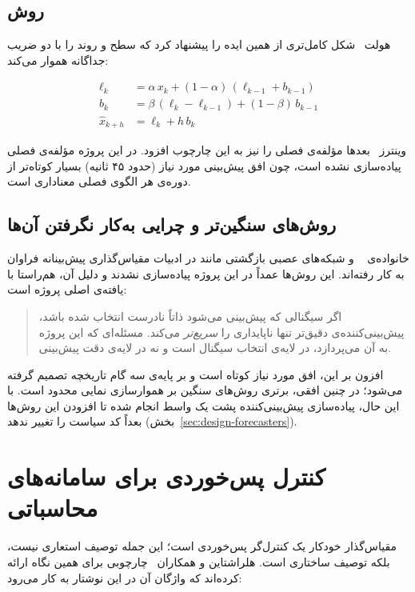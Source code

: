\subsection{روش }
\label{sec:bg-holt}

هولت~\cite{holt2004} شکل کامل‌تری از همین ایده را پیشنهاد کرد که سطح و روند را با دو ضریب
جداگانه هموار می‌کند:

\begin{align}
\label{eq:holt}
\ell_k &= \alpha\, x_k + (1-\alpha)\,(\ell_{k-1} + b_{k-1}) \\
b_k &= \beta\,(\ell_k - \ell_{k-1}) + (1-\beta)\, b_{k-1} \\
\hat{x}_{k+h} &= \ell_k + h\, b_k
\end{align}

وینترز~\cite{winters1960} بعدها مؤلفه‌ی فصلی را نیز به این چارچوب افزود. در این پروژه
مؤلفه‌ی فصلی پیاده‌سازی نشده است، چون افق پیش‌بینی مورد نیاز (حدود ۴۵ ثانیه) بسیار کوتاه‌تر
از دوره‌ی هر الگوی فصلی معناداری است.

\subsection{روش‌های سنگین‌تر و چرایی به‌کار نگرفتن آن‌ها}
\label{sec:bg-arima}

خانواده‌ی ~\cite{boxjenkins} و شبکه‌های عصبی بازگشتی مانند  در ادبیات
مقیاس‌گذاری پیش‌بینانه فراوان به کار رفته‌اند. این روش‌ها عمداً در این پروژه پیاده‌سازی نشدند
و دلیل آن، هم‌راستا با یافته‌ی اصلی پروژه است:

\begin{quote}
اگر سیگنالی که پیش‌بینی می‌شود ذاتاً نادرست انتخاب شده باشد، پیش‌بینی‌کننده‌ی دقیق‌تر تنها
ناپایداری را \emph{سریع‌تر} می‌کند. مسئله‌ای که این پروژه به آن می‌پردازد، در لایه‌ی انتخاب
سیگنال است و نه در لایه‌ی دقت پیش‌بینی.
\end{quote}

افزون بر این، افق مورد نیاز کوتاه است و بر پایه‌ی سه گام تاریخچه تصمیم گرفته می‌شود؛ در چنین
افقی، برتری روش‌های سنگین بر هموارسازی نمایی محدود است. با این حال، پیاده‌سازی
پیش‌بینی‌کننده پشت یک واسط انجام شده تا افزودن این روش‌ها بعداً کد سیاست را تغییر ندهد
(بخش~\ref{sec:design-forecasters}).

\section{کنترل پس‌خوردی برای سامانه‌های محاسباتی}
\label{sec:bg-control}

مقیاس‌گذار خودکار یک کنترل‌گر پس‌خوردی است؛ این جمله توصیف استعاری نیست، بلکه توصیف ساختاری
است. هلراشتاین و همکاران~\cite{hellerstein2004} چارچوبی برای همین نگاه ارائه کرده‌اند که
واژگان آن در این نوشتار به کار می‌رود:

